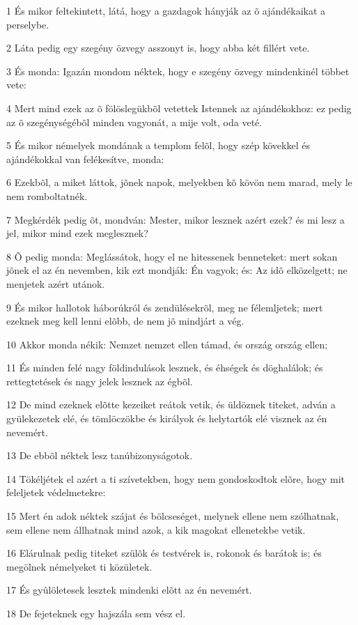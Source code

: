 \par 1 És mikor feltekintett, látá, hogy a gazdagok hányják az õ ajándékaikat a perselybe.
\par 2 Láta pedig egy szegény özvegy asszonyt is, hogy abba két fillért vete.
\par 3 És monda: Igazán mondom néktek, hogy e szegény özvegy mindenkinél többet vete:
\par 4 Mert mind ezek az õ fölöslegükbõl vetettek Istennek az ajándékokhoz: ez pedig az õ szegénységébõl minden vagyonát, a mije volt, oda veté.
\par 5 És mikor némelyek mondának a templom felõl, hogy szép kövekkel és ajándékokkal van felékesítve, monda:
\par 6 Ezekbõl, a miket láttok, jõnek napok, melyekben kõ kövön nem marad, mely le nem romboltatnék.
\par 7 Megkérdék pedig õt, mondván: Mester, mikor lesznek azért ezek? és mi lesz a jel, mikor mind ezek meglesznek?
\par 8 Õ pedig monda: Meglássátok, hogy el ne hitessenek benneteket: mert sokan jõnek el az én nevemben, kik ezt mondják: Én vagyok; és: Az idõ elközelgett; ne menjetek azért utánok.
\par 9 És mikor hallotok háborúkról és zendülésekrõl, meg ne félemljetek; mert ezeknek meg kell lenni elõbb, de nem jõ mindjárt a vég.
\par 10 Akkor monda nékik: Nemzet nemzet ellen támad, és ország ország ellen;
\par 11 És minden felé nagy földindulások lesznek, és éhségek és döghalálok; és rettegtetések és nagy jelek lesznek az égbõl.
\par 12 De mind ezeknek elõtte kezeiket reátok vetik, és üldöznek titeket, adván a gyülekezetek elé, és tömlöczökbe és királyok és helytartók elé visznek az én nevemért.
\par 13 De ebbõl néktek lesz tanúbizonyságotok.
\par 14 Tökéljétek el azért a ti szívetekben, hogy nem gondoskodtok elõre, hogy mit feleljetek védelmetekre:
\par 15 Mert én adok néktek szájat és bölcseséget, melynek ellene nem szólhatnak, sem ellene nem állhatnak mind azok, a kik magokat ellenetekbe vetik.
\par 16 Elárulnak pedig titeket szülõk és testvérek is, rokonok és barátok is; és  megölnek némelyeket ti közületek.
\par 17 És gyûlöletesek lesztek mindenki elõtt az én nevemért.
\par 18 De fejeteknek egy hajszála sem vész el.
